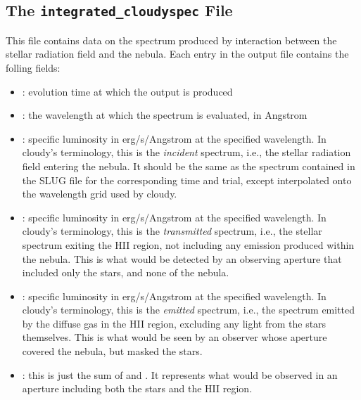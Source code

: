 \documentclass[letterpaper,10pt,english]{sphinxmanual}
\begin{document}
\subsection{The \texttt{integrated\_cloudyspec} File}
\label{cloudy:the-integrated-cloudyspec-file}\label{cloudy:sssec-int-cloudyspec-file}
This file contains data on the spectrum produced by interaction
between the stellar radiation field and the nebula. Each entry in the
output file contains the folling fields:
\begin{itemize}
\item {} 
: evolution time at which the output is produced

\item {} 
: the wavelength at which the spectrum is evaluated,
in Angstrom

\item {} 
: specific luminosity in erg/s/Angstrom at the specified
wavelength. In cloudy's terminology, this is the \emph{incident}
spectrum, i.e., the stellar radiation field entering the nebula. It
should be the same as the spectrum contained in the SLUG
 file for the corresponding time and trial,
except interpolated onto the wavelength grid used by cloudy.

\item {} 
:  specific luminosity in erg/s/Angstrom at the specified
wavelength. In cloudy's terminology, this is the \emph{transmitted}
spectrum, i.e., the stellar spectrum exiting the HII region, not
including any emission produced within the nebula. This is what
would be detected by an observing aperture that included only the
stars, and none of the nebula.

\item {} 
:  specific luminosity in erg/s/Angstrom at the specified
wavelength. In cloudy's terminology, this is the \emph{emitted}
spectrum, i.e., the spectrum emitted by the diffuse gas in the HII
region, excluding any light from the stars themselves. This is what
would be seen by an observer whose aperture covered the nebula, but
masked the stars.

\item {} 
: this is just the sum of
 and . It represents what would be
observed in an aperture including both the stars and the HII
region.

\end{itemize}
\end{document}
